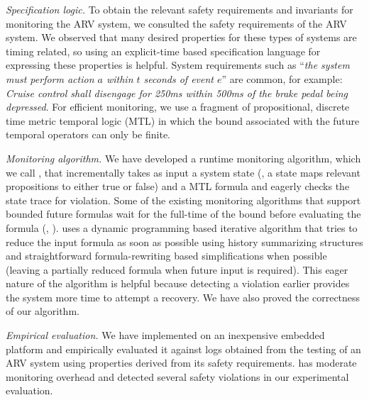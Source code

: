 \textit{Specification logic.}
To obtain the relevant safety requirements and invariants for monitoring the ARV system, we consulted the safety requirements of the ARV system. 
We observed that many desired properties for these types of systems are timing related, so using an explicit-time based specification language for expressing these properties is helpful. 
System requirements such as ``\emph{the system must perform action $a$ within $t$ seconds of event $e$}'' are common, 
%
for example: \emph{Cruise control shall disengage for 250ms within 500ms of the brake pedal being depressed}.
%
For efficient monitoring, we use a fragment of propositional, discrete time metric temporal logic (MTL)\cite{Koymans1990} in which the bound associated with the future temporal operators can only be finite. %

\textit{Monitoring algorithm.}
We have developed a runtime monitoring algorithm, which we call \monitor, that incrementally takes as input a system state (\ie, a state maps relevant propositions to either true or false) and a MTL formula and eagerly checks the state trace for violation. 
Some of the existing monitoring algorithms that support bounded future formulas wait for the full-time of the bound before evaluating the formula (\eg, \cite{Basin2008}). 
\monitor uses a dynamic programming based iterative algorithm that tries to reduce the input formula as soon as possible using history summarizing structures and straightforward formula-rewriting based simplifications when possible (leaving a partially reduced formula when future input is required).
This eager nature of the algorithm is helpful because detecting a violation earlier provides the system more time to attempt a recovery. We have also proved the correctness of our algorithm. 

\textit{Empirical evaluation.} 
We have implemented \monitor on an inexpensive embedded platform and empirically evaluated it against logs obtained from the testing of an ARV system using properties derived from its safety requirements.
\monitor has moderate monitoring overhead and detected several safety violations in our experimental evaluation.  





